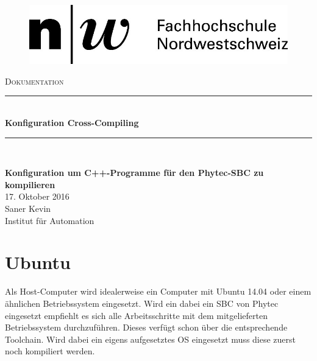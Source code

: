 \documentclass[12pt]{article} %
\begin{document}
	
	\begin{titlepage}
		
		\newcommand{\HRule}{\rule{\linewidth}{0.5mm}} %
		
		\centering %
		
		\begin{figure}[h] 
			\centering
			\includegraphics[width=.4\textwidth]{Logo-FHNW}
		\end{figure}
		
		\textsc{\Large Dokumentation}\\[0.5cm] %
		\begin{doublespace}
			\HRule \\[1cm]
			{ \huge \bfseries Konfiguration Cross-Compiling}\\[1cm] %
			\HRule \\[1cm]
		\end{doublespace}

		{\large \textbf{Konfiguration um C++-Programme für den Phytec-SBC zu kompilieren}}\\[1cm] %

		{\large 17. Oktober 2016}\\[1cm] %
		
		{\large Saner Kevin}\\[1cm]
		{\large Institut für Automation}
		
		\vfill %
		
	\end{titlepage}
	
	\setcounter{page}{1}
	\pagestyle{fancy}
	\rfoot{\thepage}
	
	\section{Ubuntu}
	Als Host-Computer wird idealerweise ein Computer mit Ubuntu 14.04 oder einem ähnlichen Betriebssystem eingesetzt. Wird ein dabei ein SBC von Phytec eingesetzt empfiehlt es sich alle Arbeitsschritte mit dem mitgelieferten Betriebssystem durchzuführen. Dieses verfügt schon über die entsprechende Toolchain. Wird dabei ein eigens aufgesetztes OS eingesetzt muss diese zuerst noch kompiliert werden. 
	
\end{document}
